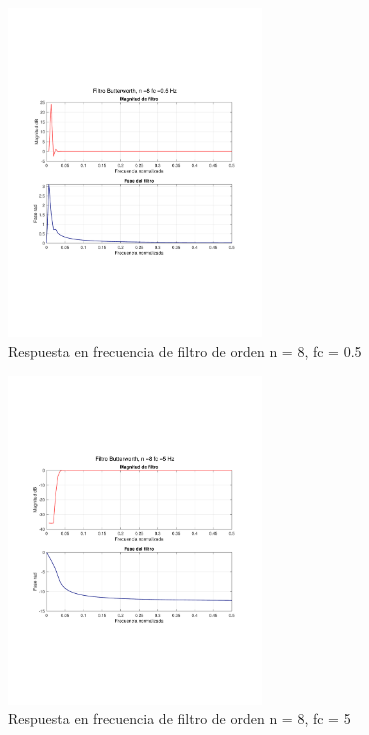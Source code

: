 		\begin{figure}[H]
			\center
			\includegraphics[width=0.6\textwidth,clip, trim = {1.9cm 6.8cm 2.3cm 7cm}]{../plots/1_c_filter_butter_8_freq_05.pdf}
			\caption{Respuesta en frecuencia de filtro de orden n = 8, fc = 0.5}
			\label{fig:1_c_n8_fc_05}
		\end{figure}
		
		\begin{figure}[H]
			\center
			\includegraphics[width=0.6\textwidth,clip, trim = {1.9cm 6.8cm 2.3cm 7cm}]{../plots/1_c_filter_butter_8_freq_5.pdf}
			\caption{Respuesta en frecuencia de filtro de orden n = 8, fc = 5}
			\label{fig:1_c_n8_fc_5}
		\end{figure}
		
